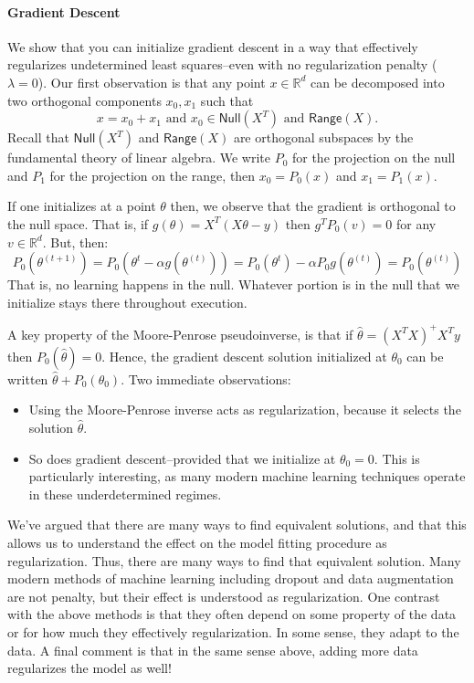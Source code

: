 \documentclass{article}
\newcommand{\R}{\mathbb{R}}
\begin{document}
\paragraph*{Gradient Descent}
We show that you can initialize gradient descent in a way that
effectively regularizes undetermined least squares--even with no
regularization penalty ($\lambda = 0$). Our first observation is that
any point $x \in \R^{d}$ can be decomposed into two orthogonal
components $x_0,x_1$ such that
\[ x = x_0 + x_1 \text{ and } x_0 \in \mathsf{Null}(X^T) \text{ and } \mathsf{Range}(X). \]
Recall that $\mathsf{Null}(X^T)$ and $\mathsf{Range}(X)$ are orthogonal
subspaces by the fundamental theory of linear algebra.
We write $P_0$ for the projection on the null and $P_1$ for the
projection on the range, then $x_0 = P_0(x)$ and $x_1 = P_1(x)$.

If one initializes at a point $\theta$ then, we observe that the
gradient is orthogonal to the null space. That is, if $g(\theta) =
X^T(X\theta -y)$ then $g^TP_{0}(v) = 0$ for any $v \in \R^d$. But, then:
\[ P_{0}(\theta^{(t+1)}) = P_0(\theta^{t} - \alpha g(\theta^{(t)})) = P_{0}(\theta^{t}) - \alpha P_{0} g(\theta^{(t)}) = P_{0}(\theta^{(t)}) \]
That is, no learning happens in the null. Whatever portion is in the
null that we initialize stays there throughout execution. 

A key property of the Moore-Penrose pseudoinverse, is that if $\hat{\theta} =
(X^TX)^{+}X^Ty$ then $P_{0}(\hat{\theta}) = 0$. Hence, the
gradient descent solution initialized at $\theta_0$ can be written
$\hat{\theta} + P_{0}(\theta_0)$. Two immediate observations:
\begin{itemize}
  \item Using the Moore-Penrose inverse acts as regularization,
    because it selects the solution $\hat{\theta}$.
  \item So does gradient descent--provided that we initialize at
    $\theta_0=0$. This is particularly interesting, as many modern
    machine learning techniques operate in these underdetermined
    regimes.
\end{itemize}

We've argued that there are many ways to find equivalent solutions,
and that this allows us to understand the effect on the model fitting
procedure as regularization. Thus, there are many ways to find that
equivalent solution. Many modern methods of machine learning including
dropout and data augmentation are not penalty, but their effect is
understood as regularization. One contrast with the above methods is
that they often depend on some property of the data or for how much
they effectively regularization. In some sense, they adapt to the
data. A final comment is that in the same sense above, adding more
data regularizes the model as well!
\end{document}
